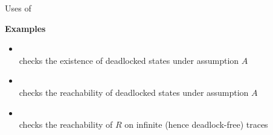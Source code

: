 \documentclass[10pt,aspectratio=149]{beamer}
\begin{document}

\begin{frame}{Uses of \ }

\textbf{\large Examples}
\bigskip

\begin{itemize}
\item
{} \\[.7ex]
checks the \alert{existence} of deadlocked states under assumption $A$
\bigskip
\pause

\item
{} \\[.7ex]
checks the \alert{reachability} of deadlocked states under assumption $A$
\bigskip
\pause

\item
{} \\[.7ex]
checks the \alert{reachability} of $R$ on \alert{infinite} 
(hence deadlock-free) traces
\end{itemize}
\end{frame}

\end{document}

